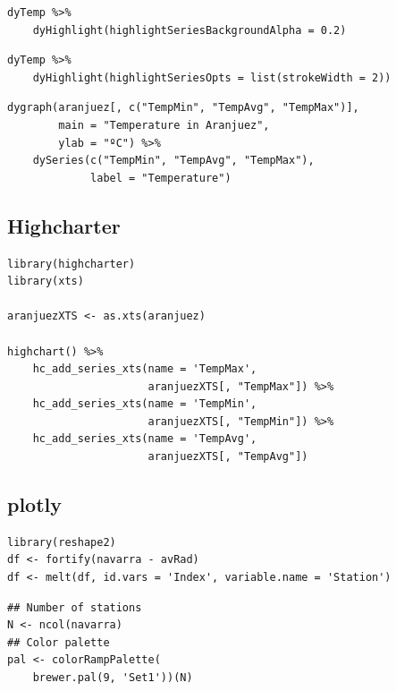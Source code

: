 \documentclass[smallroyalvopaper]{memoir}
\begin{document}
\lstset{language=r,label= ,caption= ,captionpos=b,numbers=none}
\begin{lstlisting}
dyTemp %>%
    dyHighlight(highlightSeriesBackgroundAlpha = 0.2)
\end{lstlisting}

\lstset{language=r,label= ,caption= ,captionpos=b,numbers=none}
\begin{lstlisting}
dyTemp %>%
    dyHighlight(highlightSeriesOpts = list(strokeWidth = 2))
\end{lstlisting}

\lstset{language=r,label= ,caption= ,captionpos=b,numbers=none}
\begin{lstlisting}
dygraph(aranjuez[, c("TempMin", "TempAvg", "TempMax")],
        main = "Temperature in Aranjuez",
        ylab = "ºC") %>%
    dySeries(c("TempMin", "TempAvg", "TempMax"),
             label = "Temperature")
\end{lstlisting}

\subsection{Highcharter \label{sec:highcharter}}
\label{sec:org5bd5719}

\lstset{language=r,label= ,caption= ,captionpos=b,numbers=none}
\begin{lstlisting}
library(highcharter)
library(xts)

aranjuezXTS <- as.xts(aranjuez)

highchart() %>%
    hc_add_series_xts(name = 'TempMax',
                      aranjuezXTS[, "TempMax"]) %>%
    hc_add_series_xts(name = 'TempMin',
                      aranjuezXTS[, "TempMin"]) %>%
    hc_add_series_xts(name = 'TempAvg',
                      aranjuezXTS[, "TempAvg"])

\end{lstlisting}

\subsection{plotly \label{sec:plotly}}
\label{sec:orgf73492c}

\lstset{language=r,label= ,caption= ,captionpos=b,numbers=none}
\begin{lstlisting}
library(reshape2)
df <- fortify(navarra - avRad)
df <- melt(df, id.vars = 'Index', variable.name = 'Station')
\end{lstlisting}

\lstset{language=r,label= ,caption= ,captionpos=b,numbers=none}
\begin{lstlisting}
## Number of stations
N <- ncol(navarra)
## Color palette
pal <- colorRampPalette(
    brewer.pal(9, 'Set1'))(N)
\end{lstlisting}
\end{document}
